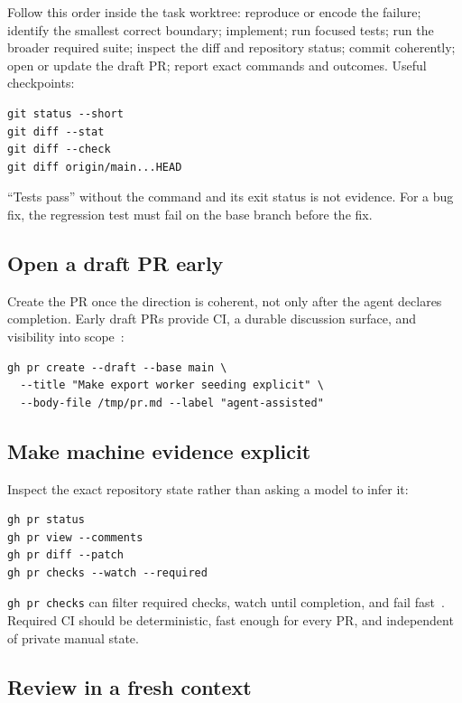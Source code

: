 \documentclass[11pt]{article}
\newcommand{\co}[1]{\lstinline[basicstyle=\ttfamily\color{gwInk}]{#1}}
\begin{document}
Follow this order inside the task worktree: reproduce or encode the failure; identify the
smallest correct boundary; implement; run focused tests; run the broader required suite; inspect
the diff and repository status; commit coherently; open or update the draft PR; report exact
commands and outcomes. Useful checkpoints:

\begin{lstlisting}[style=gw]
git status --short
git diff --stat
git diff --check
git diff origin/main...HEAD
\end{lstlisting}

``Tests pass'' without the command and its exit status is not evidence. For a bug fix, the
regression test must fail on the base branch before the fix.

\subsection{Open a draft PR early}

Create the PR once the direction is coherent, not only after the agent declares completion. Early
draft PRs provide CI, a durable discussion surface, and visibility into
scope~\cite{github2026prcreate}:

\begin{lstlisting}[style=gw]
gh pr create --draft --base main \
  --title "Make export worker seeding explicit" \
  --body-file /tmp/pr.md --label "agent-assisted"
\end{lstlisting}

\subsection{Make machine evidence explicit}

Inspect the exact repository state rather than asking a model to infer it:

\begin{lstlisting}[style=gw]
gh pr status
gh pr view --comments
gh pr diff --patch
gh pr checks --watch --required
\end{lstlisting}

\co{gh pr checks} can filter required checks, watch until completion, and fail
fast~\cite{github2026prchecks}. Required CI should be deterministic, fast enough for every PR,
and independent of private manual state.

\subsection{Review in a fresh context}
\end{document}
